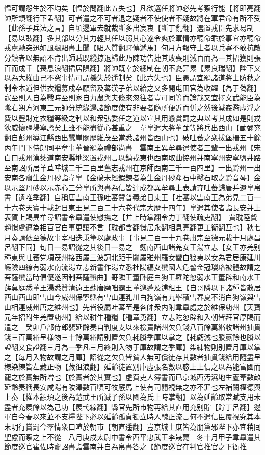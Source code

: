 愠可謂怨生於不均矣【愠於問翻此五失也】凡欲選任將帥必先考察行能【將即亮翻帥所類翻行下孟翻】可者遣之不可者退之疑者不使使者不疑故將在軍君命有所不受【此孫子兵法之言】自頃邊軍去就裁斷多出宸衷【斷丁亂翻】選置戎臣先求易制【易以䜴翻】多其部以分其力輕其任以弱其心遂令爽於軍情亦聽命乖於事宜亦聽命戎虜馳突迅如風飊馹書上聞【馹人質翻驛傳遞馬】旬月方報守土者以兵寡不敢抗敵分鎮者以無詔不肯出師賊既縱掠退歸此乃陳功告捷其敗喪則減百而為一其捃獲則張百而成千【喪息浪翻捃居隕翻】將帥既幸於總制在朝不憂罪累【累良瑞翻】陛下又以為大權由己不究事情可謂機失於遥制矣【此六失也】臣愚謂宜罷諸道將士防秋之制令本道但供衣糧募戍卒願留及蕃漢子弟以給之又多開屯田官為收糴【為于偽翻】寇至則人自為戰時至則家自力農與夫倏來忽往者豈可同等而論哉又宜擇文武能臣為隴右朔方河東三元帥分統緣邊諸節度使有非要者隨所便近而併之然後減姦濫虛浮之費以豐財定衣糧等級之制以和衆弘委任之道以宣其用懸賞罰之典以考其成如是則戎狄威懷疆場寧謐矣上雖不能盡從心甚重之　韋臯遣大將董勔等將兵出西山【勔彌兖翻自彭州導江縣西出蠶崖關歷維茂至當悉諸州皆西山也】破吐蕃之衆拔堡柵五十餘　丙午門下侍郎同平章事董晉罷為禮部尚書　雲南王異牟尋遣使者三輩一出戎州【宋白曰戎州漢僰道南安縣地梁置戎州言以鎮戎夷也西南取曲恊州并南寧州安寧鹽井路至南詔所居羊苴哶城二千三百里舊志戎州在京師西南三千一百四里】一出黔州一出安南各齎生金丹砂詣韋臯【金礦未經鍜鍊者為生金丹砂產石中鑿石取之黔音琴】金以示堅丹砂以示赤心三分臯所與書為信皆達成都異牟尋上表請弃吐蕃歸唐并遺臯帛書【遺唯季翻】自稱唐雲南王孫吐蕃贊普義弟日東王【吐蕃以雲南王為弟見二百一十六卷天寶十載封日東王見二百二十六卷代宗大歷十四年】臯遣其使者詣長安并上表賀上賜異牟尋詔書令臯遣使慰撫之【并上時掌翻令力丁翻使疏吏翻】　賈耽陸贄趙憬盧邁為相百官白事更讓不言【耽都含翻憬居永翻相息亮翻更工衡翻互也】秋七月奏請依至德故事宰相迭秉筆以處政事【事見二百一十九卷肅宗至德元載十月處昌呂翻下同】旬日一易詔從之其後日一易之　劒南西山諸羌女王湯立志【女王亦羌别種東與吐蕃党項茂州接西屬三波訶北距于闐屬雅州羅女蠻白狼夷以女為君居康延川巗險四繚有弱水南流湯立志新書作湯立悉杜陽編女蠻國人危髻金冠瓔珞被體故謂之菩薩蠻當時倡優遂因制菩薩蠻曲】哥隣王董卧庭白狗王羅陀怱弱水王董辟和南水王薛莫庭悉董王湯悉贊清遠王蘇唐磨咄霸王董邈蓬及逋租王【自哥隣以下諸種皆散居西山西山即雪山今威州保寧縣有雪山連乳川白狗嶺有九峯積雪春夏不消白狗嶺與雪山相連威州唐之維州也】先皆役屬吐蕃至是各帥衆内附韋臯處之於維保覇州【天寶元年招附生羌置覇州】給以耕牛種糧【種章勇翻】立志陀怱辟和入朝皆拜官厚賜而遣之　癸卯戶部侍郎裴延齡奏自判度支以來檢責諸州欠負錢八百餘萬緡收諸州抽貫錢三百萬緡呈様物三十餘萬緡請别置欠負耗賸季庫以掌之【耗虧減也賸贏餘也賸以證翻又食證翻三月為一季凡三月終則入物于庫故謂之季庫】柒練物則别置月庫以掌之【每月入物故謂之月庫】詔從之欠負皆貧人無可償徒存其數者抽貫錢給用隨盡呈様染練皆左藏正物【藏徂浪翻】延齡徒置别庫虛張名數以惑上上信之以為能富國而寵之於實無所增也【於實者於其實也】虛費吏人簿書而已京城西汚濕地生蘆葦數畝延齡奏稱長安咸陽有陂澤數百頃可牧廐馬上使有司閱視無之亦不罪也左補闕權德輿上奏【權本顓頊之後為楚武王所滅子孫以國為氏上時掌翻】以為延齡取常賦支用未盡者充羨餘以為己功【羨弋線翻】縣官先所市物再給其直用充别貯【貯丁呂翻】邊軍自今春以來並不支糧陛下必以延齡孤貞獨立時人醜正流言何不遣信臣覆視究其本末明行賞罰今羣情衆口喧於朝市【朝直遥翻】豈京城士庶皆為朋黨邪陛下亦宜稍囘聖慮而察之上不從　八月庚戍太尉中書令西平忠武王李晟薨　冬十月甲子韋臯遣其節度巡官崔佐時齎詔書詣雲南并自為帛書答之【節度巡官在判官推官之下衙推